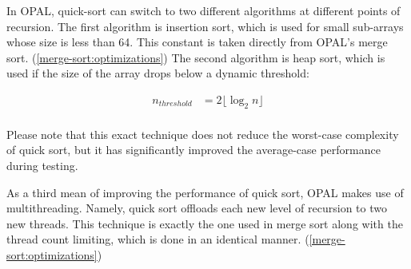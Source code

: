 In OPAL, quick-sort can switch to two different algorithms at different points of recursion. The first algorithm is insertion sort, which is used for small sub-arrays whose size is less than 64. This constant is taken directly from OPAL's merge sort. (\ref{merge-sort:optimizations}) The second algorithm is heap sort, which is used if the size of the array drops below a dynamic threshold:

\begin{equation*}
    \begin{aligned}
        n_{threshold} &= 2 \lfloor \log_2 n \rfloor \\
    \end{aligned}
\end{equation*}

Please note that this exact technique does not reduce the worst-case complexity of quick sort, but it has significantly improved the average-case performance during testing.

As a third mean of improving the performance of quick sort, OPAL makes use of multithreading. Namely, quick sort offloads each new level of recursion to two new threads. This technique is exactly the one used in merge sort along with the thread count limiting, which is done in an identical manner. (\ref{merge-sort:optimizations})

